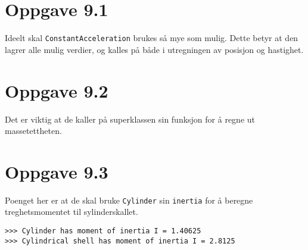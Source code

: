 \documentclass[10pt,a4paper]{article}
\begin{document}
\section*{Oppgave 9.1}
Ideelt skal \texttt{ConstantAcceleration} brukes så mye som mulig. Dette betyr at den lagrer alle mulig verdier, og kalles på både i utregningen av posisjon og hastighet.



\newpage
\section*{Oppgave 9.2}
Det er viktig at de kaller på superklassen sin funksjon for å regne ut massetettheten. 



\newpage
\section*{Oppgave 9.3}
Poenget her er at de skal bruke \texttt{Cylinder} sin \texttt{inertia} for å beregne treghetsmomentet til sylinderskallet. 

\begin{verbatim}
>>> Cylinder has moment of inertia I = 1.40625
>>> Cylindrical shell has moment of inertia I = 2.8125
\end{verbatim}
\end{document}
